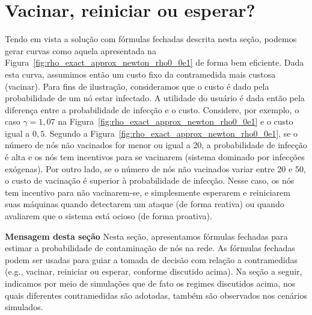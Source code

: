 	\section{Vacinar, reiniciar ou esperar?}
	    Tendo em vista a solução com fórmulas fechadas descrita nesta seção, podemos gerar curvas como aquela apresentada na Figura~\ref{fig:rho_exact_approx_newton_rho0_0e1} de forma bem eficiente.  Dada esta curva, assumimos então um custo fixo da contramedida mais custosa (vacinar).  Para fins de ilustração, consideramos que o custo é dado pela  probabilidade de um nó estar infectado. %
	    A utilidade do usuário é dada então pela diferença entre a probabilidade de infecção  e o custo.   Considere, por exemplo, o caso $\gamma=1,07$ na Figura~\ref{fig:rho_exact_approx_newton_rho0_0e1} e o custo igual a $0,5$.  Segundo a Figura~\ref{fig:rho_exact_approx_newton_rho0_0e1}, se o número de nós não vacinados for menor ou igual a 20, a probabilidade de infecção é alta e os nós tem incentivos para se vacinarem (sistema dominado por infecções exógenas).  Por outro lado, se o número de nós não vacinados variar entre 20 e 50, o custo de vacinação é superior à probabilidade de infecção. Nesse caso,  os nós tem incentivo para não vacinarem-se, e simplesmente esperarem e reiniciarem suas máquinas quando detectarem um ataque (de forma reativa) ou quando avaliarem que o sistema está ocioso (de forma proativa).   

	    \textbf{Mensagem desta seção} Nesta seção, apresentamos fórmulas fechadas para estimar a probabilidade de contaminação de nós na rede.  As fórmulas fechadas podem ser usadas para guiar a tomada de decisão com relação a contramedidas (e.g., vacinar, reiniciar ou esperar, conforme discutido acima).  Na seção a seguir, indicamos por meio de simulações que de fato os regimes discutidos acima, nos quais diferentes contramedidas são adotadas, também são observados nos cenários simulados.  

